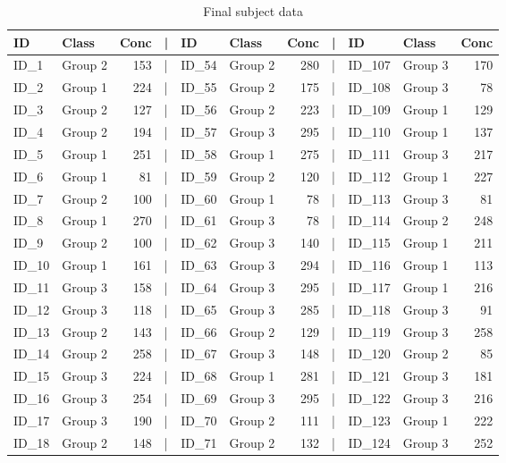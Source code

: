 \documentclass[smallextended]{svjour3}       %
\begin{document}
\begin{table}

\caption{\label{tab:show-table}Final subject data}
\centering
\begin{tabular}[t]{llrlllrlllr}
\toprule
ID & Class & Conc & | & ID & Class & Conc & | & ID & Class & Conc\\
\midrule
ID\_1 & Group 2 & 153 & | & ID\_54 & Group 2 & 280 & | & ID\_107 & Group 3 & 170\\
ID\_2 & Group 1 & 224 & | & ID\_55 & Group 2 & 175 & | & ID\_108 & Group 3 & 78\\
ID\_3 & Group 2 & 127 & | & ID\_56 & Group 2 & 223 & | & ID\_109 & Group 1 & 129\\
ID\_4 & Group 2 & 194 & | & ID\_57 & Group 3 & 295 & | & ID\_110 & Group 1 & 137\\
ID\_5 & Group 1 & 251 & | & ID\_58 & Group 1 & 275 & | & ID\_111 & Group 3 & 217\\
\addlinespace
ID\_6 & Group 1 & 81 & | & ID\_59 & Group 2 & 120 & | & ID\_112 & Group 1 & 227\\
ID\_7 & Group 2 & 100 & | & ID\_60 & Group 1 & 78 & | & ID\_113 & Group 3 & 81\\
ID\_8 & Group 1 & 270 & | & ID\_61 & Group 3 & 78 & | & ID\_114 & Group 2 & 248\\
ID\_9 & Group 2 & 100 & | & ID\_62 & Group 3 & 140 & | & ID\_115 & Group 1 & 211\\
ID\_10 & Group 1 & 161 & | & ID\_63 & Group 3 & 294 & | & ID\_116 & Group 1 & 113\\
\addlinespace
ID\_11 & Group 3 & 158 & | & ID\_64 & Group 3 & 295 & | & ID\_117 & Group 1 & 216\\
ID\_12 & Group 3 & 118 & | & ID\_65 & Group 3 & 285 & | & ID\_118 & Group 3 & 91\\
ID\_13 & Group 2 & 143 & | & ID\_66 & Group 2 & 129 & | & ID\_119 & Group 3 & 258\\
ID\_14 & Group 2 & 258 & | & ID\_67 & Group 3 & 148 & | & ID\_120 & Group 2 & 85\\
ID\_15 & Group 3 & 224 & | & ID\_68 & Group 1 & 281 & | & ID\_121 & Group 3 & 181\\
\addlinespace
ID\_16 & Group 3 & 254 & | & ID\_69 & Group 3 & 295 & | & ID\_122 & Group 3 & 216\\
ID\_17 & Group 3 & 190 & | & ID\_70 & Group 2 & 111 & | & ID\_123 & Group 1 & 222\\
ID\_18 & Group 2 & 148 & | & ID\_71 & Group 2 & 132 & | & ID\_124 & Group 3 & 252\\

\end{tabular}
\end{table}
\end{document}

